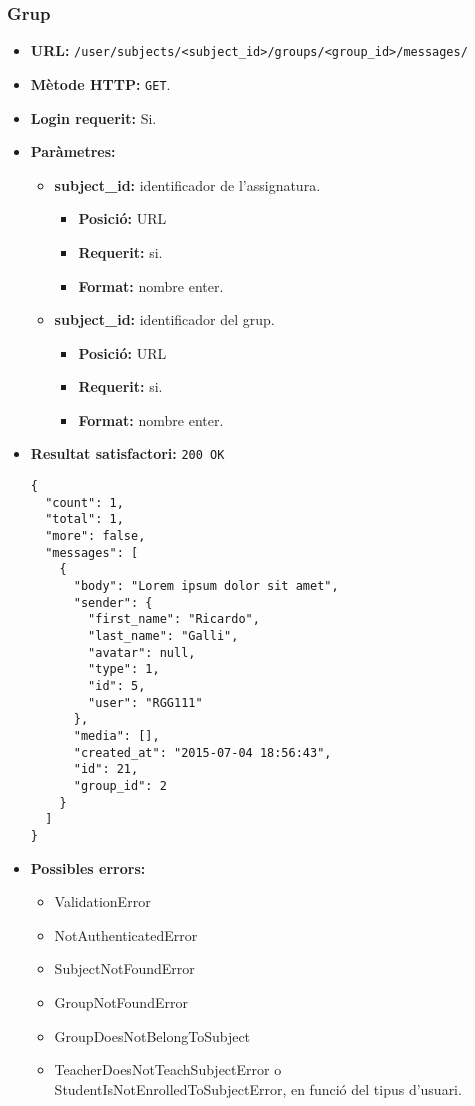	\subsubsection{Grup}
	\begin{itemize}
	\item \textbf{\ac{URL}:} \texttt{/user/subjects/<subject\_id>/groups/<group\_id>/messages/}
	\item \textbf{Mètode \ac{HTTP}: } \texttt{GET}.
	\item \textbf{Login requerit:} Si.
	\item \textbf{Paràmetres:}
	\begin{itemize}
		\item \textbf{subject\_id:} identificador de l'assignatura.
		\begin{itemize}
			\item \textbf{Posició:} \ac{URL}
			\item \textbf{Requerit:} si.
			\item \textbf{Format:} nombre enter.
		\end{itemize}
		\item \textbf{subject\_id:} identificador del grup.
		\begin{itemize}
			\item \textbf{Posició:} \ac{URL}
			\item \textbf{Requerit:} si.
			\item \textbf{Format:} nombre enter.
		\end{itemize}

	\end{itemize}
	\item \textbf{Resultat satisfactori:} \texttt{200 OK}
	\begin{verbatim}
{
  "count": 1,
  "total": 1,
  "more": false,
  "messages": [
    {
      "body": "Lorem ipsum dolor sit amet",
      "sender": {
        "first_name": "Ricardo",
        "last_name": "Galli",
        "avatar": null,
        "type": 1,
        "id": 5,
        "user": "RGG111"
      },
      "media": [],
      "created_at": "2015-07-04 18:56:43",
      "id": 21,
      "group_id": 2
    }
  ]
}
	\end{verbatim}
	\item \textbf{Possibles errors:}
	\begin{itemize}
		\item ValidationError
		\item NotAuthenticatedError
		\item SubjectNotFoundError
		\item GroupNotFoundError
		\item GroupDoesNotBelongToSubject
		\item TeacherDoesNotTeachSubjectError o StudentIsNotEnrolledToSubjectError, en funció del tipus d'usuari.
	\end{itemize}
	\end{itemize}
	
